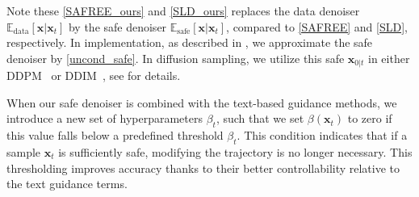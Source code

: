 Note these \eqref{SAFREE_ours} and \eqref{SLD_ours} replaces the data denoiser $\mathbb{E}_{\text{data}}[\mathbf{x}\vert\mathbf{x}_{t}]$ by the safe denoiser $\mathbb{E}_{\text{safe}}[\mathbf{x}\vert\mathbf{x}_{t}]$, compared to \eqref{SAFREE} and \eqref{SLD}, respectively. In implementation, as described in , we approximate the safe denoiser by \eqref{uncond_safe}. In diffusion sampling, we utilize this safe $\mathbf{x}_{0\vert t}$ in either DDPM~\cite{ho2020denoising} or DDIM~\cite{song2020denoising}, see  for details.


When our safe denoiser is combined  with the text-based guidance methods, we introduce a new set of hyperparameters $\beta_{t}$, such that we set $\beta(\mathbf{x}_{t})$ to zero if this value falls below a predefined threshold $\beta_{t}$. This condition indicates that if a sample $\mathbf{x}_{t}$ is sufficiently safe, modifying the trajectory is no longer necessary. This thresholding improves accuracy thanks to their better controllability relative to the text guidance terms.

%
%
%
%





%

%
%
%
%

